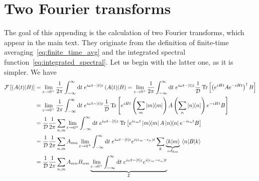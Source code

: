 \chapter{Two Fourier transforms\label{app:fourier}}
\thispagestyle{chapterBeginStyle}
The goal of this appending is the calculation of two Fourier transforms, which appear in the main text.
They originate from the definition of finite-time averaging~\eqref{eq:finite_time_avg} and
the integrated spectral function~\eqref{eq:integrated_spectral}. Let us begin with the latter one,
as it is simpler. We have
\begin{align}
    \mathcal{F}\left[\hs{A(t)}{B}\right] & = \lim _{\varepsilon \to 0^+} \frac{1}{2 \pi} \int_{-\infty}^{\infty} \mathrm{d} t
    \; e^{i \omega t-|t| \varepsilon}\hs{A(t)}{B} = \lim _{\varepsilon \to 0^+} \frac{1}{2 \pi}
    \int_{-\infty}^{\infty} \mathrm{d} t \; e^{i \omega t-|t| \varepsilon} \frac{1}{\dimension}
    \Tr\left[\left(e^{iHt}Ae^{-iHt}\right)^{\dagger}B\right] \nonumber                                                                    \\
                                         & =\lim _{\varepsilon \to 0^+} \frac{1}{2 \pi}
    \int_{-\infty}^{\infty} \mathrm{d} t \; e^{i \omega t-|t| \varepsilon} \frac{1}{\dimension}
    \Tr\left[e^{iHt}\left(\sum_{m} \ketbra{m}{m}\right)
    A\left(\sum_{n} \ketbra{n}{n}\right)e^{-iHt}B\right] \nonumber                                                                        \\
                                         & = \frac{1}{\dimension} \frac{1}{2 \pi}\sum_{n,m} \lim _{\varepsilon \to 0^+}
    \int_{-\infty}^{\infty} \mathrm{d} t \; e^{i \omega t-|t| \varepsilon}
    \Tr\left[e^{i \epsilon_m t}\ketbra{m}{m} A\ketbra{n}{n}e^{-i \epsilon_n t}B\right] \nonumber                                          \\
                                         & = \frac{1}{\dimension} \frac{1}{2 \pi}\sum_{n,m} A_{mn}  \lim _{\varepsilon \to 0^+}
    \int_{-\infty}^{\infty} \mathrm{d} t \; e^{i \omega t-|t| \varepsilon}e^{i (\epsilon_m-\epsilon_n) t}
    \sum_{k} \underbrace{\braket{k}{m}}_{=\delta_{km}} \matrixel{n}{B}{k} \nonumber                                                       \\
                                         & = \frac{1}{\dimension} \frac{1}{2 \pi}\sum_{n,m} A_{mn} B_{nm}  \underbrace{\lim _{\varepsilon
        \to 0^+} \int_{-\infty}^{\infty} \mathrm{d} t \; e^{i \omega t-|t|
            \varepsilon}e^{i (\epsilon_m-\epsilon_n) t}}_{\mathcal{I}}\label{eq:spectral function simplified}
\end{align}
